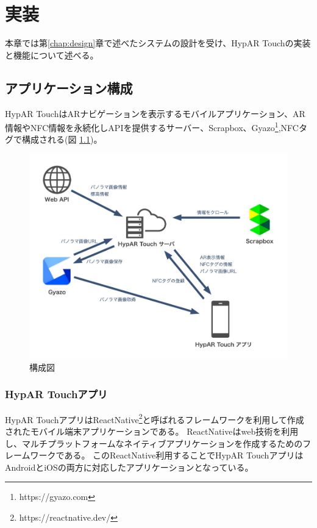 \chapter{実装}
\label{chap:implementation}

本章では第\ref{chap:design}章で述べたシステムの設計を受け、HypAR Touchの実装と機能について述べる。

\newpage

\section{アプリケーション構成}
HypAR TouchはARナビゲーションを表示するモバイルアプリケーション、AR情報やNFC情報を永続化しAPIを提供するサーバー、Scrapbox、Gyazo\footnote{\textsf{https://gyazo.com}},NFCタグで構成される(図 \ref{fig:application_structure})。

\begin{figure}[h]
  \centering
  \includegraphics[width=150mm]{images/application_structure.jpg}
  \caption{構成図} \label{fig:application_structure}
\end{figure}

\subsection{HypAR Touchアプリ}
HypAR TouchアプリはReactNative\footnote{\textsf{https://reactnative.dev/}}と呼ばれるフレームワークを利用して作成されたモバイル端末アプリケーションである。
ReactNativeはweb技術を利用し、マルチプラットフォームなネイティブアプリケーションを作成するためのフレームワークである。
このReactNative利用することでHypAR TouchアプリはAndroidとiOSの両方に対応したアプリケーションとなっている。

